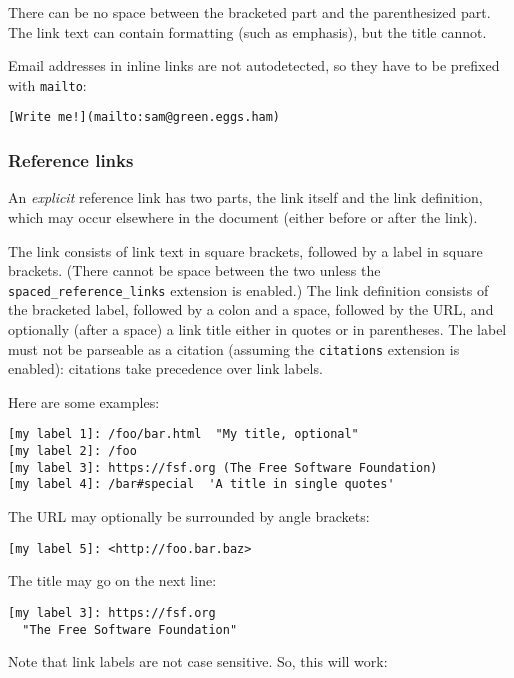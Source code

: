 There can be no space between the bracketed part and the parenthesized
part. The link text can contain formatting (such as emphasis), but the
title cannot.

Email addresses in inline links are not autodetected, so they have to be
prefixed with \texttt{mailto}:

\begin{verbatim}
[Write me!](mailto:sam@green.eggs.ham)
\end{verbatim}

\hypertarget{reference-links}{%
\subsubsection{Reference links}\label{reference-links}}

An \emph{explicit} reference link has two parts, the link itself and the
link definition, which may occur elsewhere in the document (either
before or after the link).

The link consists of link text in square brackets, followed by a label
in square brackets. (There cannot be space between the two unless the
\texttt{spaced\_reference\_links} extension is enabled.) The link
definition consists of the bracketed label, followed by a colon and a
space, followed by the URL, and optionally (after a space) a link title
either in quotes or in parentheses. The label must not be parseable as a
citation (assuming the \texttt{citations} extension is enabled):
citations take precedence over link labels.

Here are some examples:

\begin{verbatim}
[my label 1]: /foo/bar.html  "My title, optional"
[my label 2]: /foo
[my label 3]: https://fsf.org (The Free Software Foundation)
[my label 4]: /bar#special  'A title in single quotes'
\end{verbatim}

The URL may optionally be surrounded by angle brackets:

\begin{verbatim}
[my label 5]: <http://foo.bar.baz>
\end{verbatim}

The title may go on the next line:

\begin{verbatim}
[my label 3]: https://fsf.org
  "The Free Software Foundation"
\end{verbatim}

Note that link labels are not case sensitive. So, this will work:

